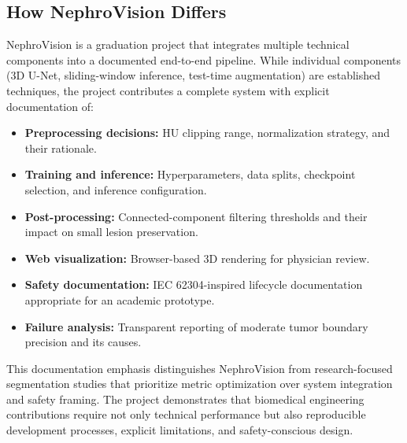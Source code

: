 \subsection{How NephroVision Differs}

NephroVision is a graduation project that integrates multiple technical components into a documented end-to-end pipeline. While individual components (3D U-Net, sliding-window inference, test-time augmentation) are established techniques, the project contributes a complete system with explicit documentation of:

\begin{itemize}
    \item \textbf{Preprocessing decisions:} HU clipping range, normalization strategy, and their rationale.
    \item \textbf{Training and inference:} Hyperparameters, data splits, checkpoint selection, and inference configuration.
    \item \textbf{Post-processing:} Connected-component filtering thresholds and their impact on small lesion preservation.
    \item \textbf{Web visualization:} Browser-based 3D rendering for physician review.
    \item \textbf{Safety documentation:} IEC 62304-inspired lifecycle documentation appropriate for an academic prototype.
    \item \textbf{Failure analysis:} Transparent reporting of moderate tumor boundary precision and its causes.
\end{itemize}

This documentation emphasis distinguishes NephroVision from research-focused segmentation studies that prioritize metric optimization over system integration and safety framing. The project demonstrates that biomedical engineering contributions require not only technical performance but also reproducible development processes, explicit limitations, and safety-conscious design.
